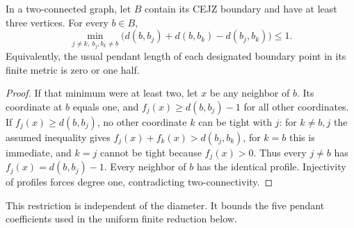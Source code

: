 \begin{lemma}\label{lem:pendantmetric}
In a two-connected graph, let $B$ contain its CEJZ boundary and have at
least three vertices. For every $b\in B$,
\[
 \min_{j\ne k,\ b_j,b_k\ne b}
 \bigl(d(b,b_j)+d(b,b_k)-d(b_j,b_k)\bigr)\le1.
\]
Equivalently, the usual pendant length of each designated boundary point
in its finite metric is zero or one half.
\end{lemma}
\begin{proof}
If that minimum were at least two, let $x$ be any neighbor of $b$.
Its coordinate at $b$ equals one, and $f_j(x)\ge d(b,b_j)-1$ for all
other coordinates. If $f_j(x)\ge d(b,b_j)$, no other coordinate $k$
can be tight with $j$: for $k\ne b,j$ the assumed inequality gives
$f_j(x)+f_k(x)>d(b_j,b_k)$, for $k=b$ this is immediate, and
$k=j$ cannot be tight because $f_j(x)>0$.
Thus every $j\ne b$ has $f_j(x)=d(b,b_j)-1$.
Every neighbor of $b$ has the identical profile. Injectivity of profiles
forces degree one, contradicting two-connectivity.
\end{proof}
This restriction is independent of the diameter. It bounds the five
pendant coefficients used in the uniform finite reduction below.
